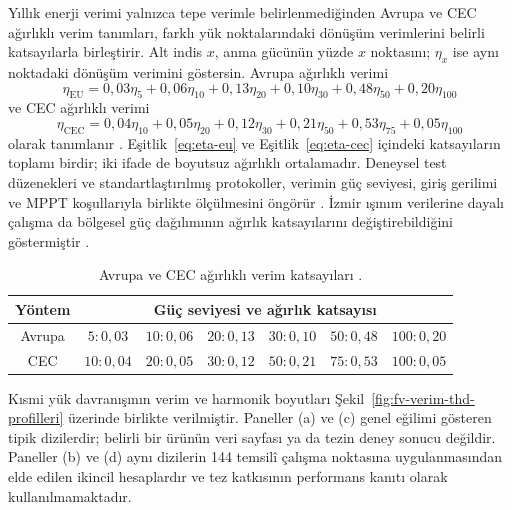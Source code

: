 Yıllık enerji verimi yalnızca tepe verimle belirlenmediğinden Avrupa ve CEC ağırlıklı verim tanımları, farklı yük noktalarındaki dönüşüm verimlerini belirli katsayılarla birleştirir. Alt indis $x$, anma gücünün yüzde $x$ noktasını; $\eta_x$ ise aynı noktadaki dönüşüm verimini göstersin. Avrupa ağırlıklı verimi
\begin{equation}
\eta_{\mathrm{EU}}=0{,}03\eta_{5}+0{,}06\eta_{10}+0{,}13\eta_{20}+0{,}10\eta_{30}+0{,}48\eta_{50}+0{,}20\eta_{100}
\label{eq:eta-eu}
\end{equation}
ve CEC ağırlıklı verimi
\begin{equation}
\eta_{\mathrm{CEC}}=0{,}04\eta_{10}+0{,}05\eta_{20}+0{,}12\eta_{30}+0{,}21\eta_{50}+0{,}53\eta_{75}+0{,}05\eta_{100}
\label{eq:eta-cec}
\end{equation}
olarak tanımlanır \citep{Sera2008,Sandia2015}. Eşitlik~\eqref{eq:eta-eu} ve Eşitlik~\eqref{eq:eta-cec} içindeki katsayıların toplamı birdir; iki ifade de boyutsuz ağırlıklı ortalamadır. Deneysel test düzenekleri ve standartlaştırılmış protokoller, verimin güç seviyesi, giriş gerilimi ve MPPT koşullarıyla birlikte ölçülmesini öngörür \citep{Sera2008,Sandia2015}. İzmir ışınım verilerine dayalı çalışma da bölgesel güç dağılımının ağırlık katsayılarını değiştirebildiğini göstermiştir \citep{Ongun2013}.

\begin{table}[htbp]
  \centering
  \caption{Avrupa ve CEC ağırlıklı verim katsayıları \citep{Sera2008,Sandia2015}.}
  \label{tab:agirlikli-verim-katsayilari}
  \begin{tabular}{c*{6}{c}}
    \toprule
    \textbf{Yöntem} & \multicolumn{6}{c}{\textbf{Güç seviyesi ve ağırlık katsayısı}} \\
    \midrule
    Avrupa & $5:0{,}03$ & $10:0{,}06$ & $20:0{,}13$ & $30:0{,}10$ & $50:0{,}48$ & $100:0{,}20$ \\
    CEC & $10:0{,}04$ & $20:0{,}05$ & $30:0{,}12$ & $50:0{,}21$ & $75:0{,}53$ & $100:0{,}05$ \\
    \bottomrule
  \end{tabular}
\end{table}

Kısmi yük davranışının verim ve harmonik boyutları Şekil~\ref{fig:fv-verim-thd-profilleri} üzerinde birlikte verilmiştir. Paneller (a) ve (c) genel eğilimi gösteren tipik dizilerdir; belirli bir ürünün veri sayfası ya da tezin deney sonucu değildir. Paneller (b) ve (d) aynı dizilerin 144 temsilî çalışma noktasına uygulanmasından elde edilen ikincil hesaplardır ve tez katkısının performans kanıtı olarak kullanılmamaktadır.

